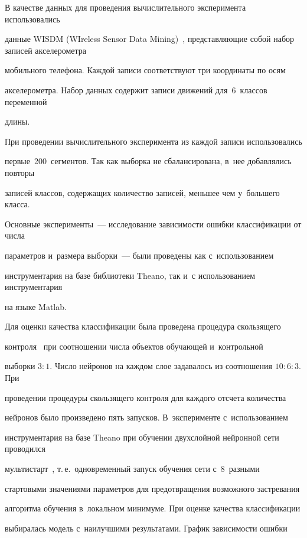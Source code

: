 В качестве данных для проведения вычислительного эксперимента использовались 


данные WISDM (WIreless Sensor Data Mining)~\cite{wisdm}, представляющие собой набор записей акселерометра 


мобильного телефона. Каждой записи соответствуют три координаты по осям 


акселерометра. Набор данных содержит записи движений для~6~классов переменной 


длины.


При проведении вычислительного эксперимента из каждой записи использовались 


первые~200~сегментов. Так как выборка не сбалансирована, в~нее добавлялись повторы 


записей классов, содержащих количество записей, меньшее чем у~большего класса.





Основные эксперименты~--- исследование зависимости ошибки классификации от числа 


параметров и~размера выборки~--- были проведены как с~использованием 


инструментария на базе библиотеки Theano, так и~с использованием инструментария 


на языке Matlab.


Для оценки качества классификации была проведена процедура скользящего 


контроля~\cite{cv} при соотношении числа объектов обуча\-ющей и~контрольной 


выборки $3:1$. Число нейронов на каждом слое задавалось из соотношения $10:6:3$. При 


проведении процедуры скользящего контроля для каждого отсчета количества 


нейронов было произведено пять запусков. В~эксперименте с~использованием 


инструментария на базе Theano при обучении двухслойной нейронной сети проводился 


мультистарт~\cite{multi}, т.\,е.\ одновременный запуск обучения сети с~8~разными 


стартовыми значениями параметров для предотвращения возможного застревания 


алгоритма обучения в~локальном минимуме. При оценке качества классификации 


выбиралась модель с~наилучшими результатами. График зависимости ошибки 


